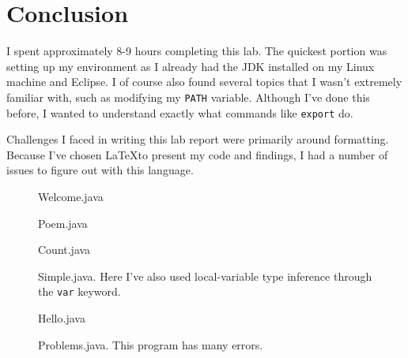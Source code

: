 \documentclass[leqno, 11pt]{article}
\begin{document}
\section*{Conclusion}
I spent approximately 8-9 hours completing this lab. The quickest portion was setting up my environment as I already had the JDK installed on my Linux machine and Eclipse. I of course also found several topics that I wasn't extremely familiar with, such as modifying my \texttt{PATH} variable. Although I've done this before, I wanted to understand exactly what commands like \texttt{export} do. 

Challenges I faced in writing this lab report were primarily around formatting. Because I've chosen \LaTeX to present my code and findings, I had a number of issues to figure out with this language.

\newpage

\begin{figure}[t!]
  \centering
  
  \caption{Welcome.java}
  \label{fig:one}
\end{figure}

\begin{figure}[t!]
  \centering
  
  \caption{Poem.java}
  \label{fig:two}
\end{figure}

\begin{figure}
  \centering
  
  \caption{Count.java}
  \label{fig:three}
\end{figure}

\newpage

\begin{figure}
  \centering
  
  \caption{Simple.java. Here I've also used local-variable type inference through the \texttt{var} keyword.}
  \label{fig:four}
\end{figure}

\begin{figure}
  \centering
  
  \caption{Hello.java}
  \label{fig:five}
\end{figure}

\begin{figure}
  \centering
  
  \caption{Problems.java. This program has many errors.}
  \label{fig:six}
\end{figure}
\end{document}
